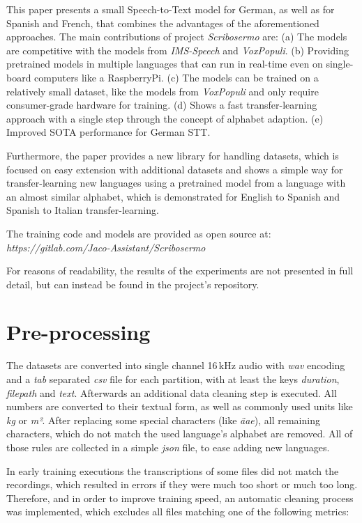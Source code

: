 \vspace{9pt}
This paper presents a small Speech-to-Text model for German, as well as for Spanish and French, that combines the advantages of the aforementioned approaches. The main contributions of project \textit{Scribosermo} are:
(a) The models are competitive with the models from \textit{IMS-Speech} and \textit{VoxPopuli}.
(b) Providing pretrained models in multiple languages that can run in real-time even on single-board computers like a RaspberryPi.
(c) The models can be trained on a relatively small dataset, like the models from \textit{VoxPopuli} and only require consumer-grade hardware for training.
(d) Shows a fast transfer-learning approach with a single step through the concept of alphabet adaption.
(e) Improved SOTA performance for German STT.

Furthermore, the paper provides a new library for handling datasets, which is focused on easy extension with additional datasets and shows a simple way for transfer-learning new languages using a pretrained model from a language with an almost similar alphabet, which is demonstrated for English to Spanish and Spanish to Italian transfer-learning.

The training code and models are provided as open source at: \textit{https://gitlab.com/Jaco-Assistant/Scribosermo}

\noindent For reasons of readability, the results of the experiments are not presented in full detail, but can instead be found in the project's repository.

\section{Pre-processing}
\label{sec:prep}

The datasets are converted into single channel 16\,kHz audio with \textit{wav} encoding and a \textit{tab} separated \textit{csv} file for each partition, with at least the keys \textit{duration}, \textit{filepath} and \textit{text}. Afterwards an additional data cleaning step is executed.
All numbers are converted to their textual form, as well as commonly used units like \textit{kg} or \textit{m²}. After replacing some special characters (like \textit{ä}\textrightarrow{}\textit{ae}), all remaining characters, which do not match the used language's alphabet are removed. All of those rules are collected in a simple \textit{json} file, to ease adding new languages. 

In early training executions the transcriptions of some files did not match the recordings, which resulted in errors if they were much too short or much too long. Therefore, and in order to improve training speed, an automatic cleaning process was implemented, which excludes all files matching one of the following metrics:

